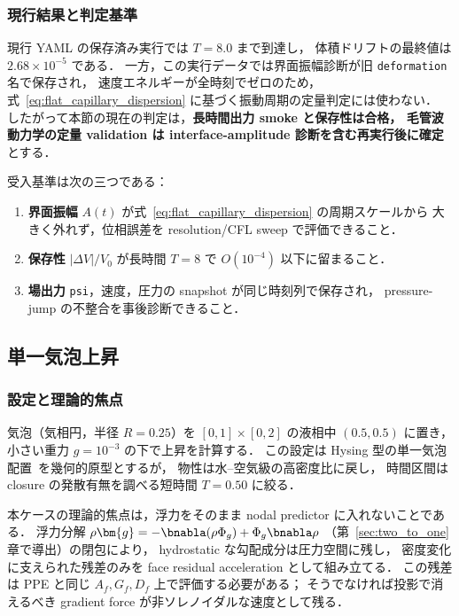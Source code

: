 \subsubsection{現行結果と判定基準}

現行 YAML の保存済み実行では $T=8.0$ まで到達し，
体積ドリフトの最終値は $2.68\times10^{-5}$ である．
一方，この実行データでは界面振幅診断が旧 \texttt{deformation} 名で保存され，
速度エネルギーが全時刻でゼロのため，
式~\eqref{eq:flat_capillary_dispersion} に基づく振動周期の定量判定には使わない．
したがって本節の現在の判定は，\textbf{長時間出力 smoke と保存性は合格，
毛管波動力学の定量 validation は interface-amplitude 診断を含む再実行後に確定}
とする．

受入基準は次の三つである：
\begin{enumerate}[noitemsep,leftmargin=2em]
  \item \textbf{界面振幅} $A(t)$ が式~\eqref{eq:flat_capillary_dispersion} の周期スケールから
        大きく外れず，位相誤差を resolution/CFL sweep で評価できること．
  \item \textbf{保存性} $|\Delta V|/V_0$ が長時間 $T=8$ で $O(10^{-4})$ 以下に留まること．
  \item \textbf{場出力} \texttt{psi}，速度，圧力の snapshot が同じ時刻列で保存され，
        pressure-jump の不整合を事後診断できること．
\end{enumerate}

\subsection{単一気泡上昇}
\label{sec:val_rising_bubble}

\subsubsection{設定と理論的焦点}

気泡（気相円，半径 $R=0.25$）を
$[0,1]\times[0,2]$ の液相中 $(0.5,0.5)$ に置き，
小さい重力 $g=10^{-3}$ の下で上昇を計算する．
この設定は Hysing 型の単一気泡配置~\cite{Hysing2009}を幾何的原型とするが，
物性は水--空気級の高密度比に戻し，
時間区間は closure の発散有無を調べる短時間 $T=0.50$ に絞る．

本ケースの理論的焦点は，浮力をそのまま nodal predictor に入れないことである．
浮力分解 $\rho\bm{g}=-\bnabla(\rho\Phi_g)+\Phi_g\bnabla\rho$
（第~\ref{sec:two_to_one}章で導出）の閉包により，
hydrostatic な勾配成分は圧力空間に残し，
密度変化に支えられた残差のみを face residual acceleration として組み立てる．
この残差は PPE と同じ $A_f,G_f,D_f$ 上で評価する必要がある；
そうでなければ投影で消えるべき gradient force が非ソレノイダルな速度として残る．

